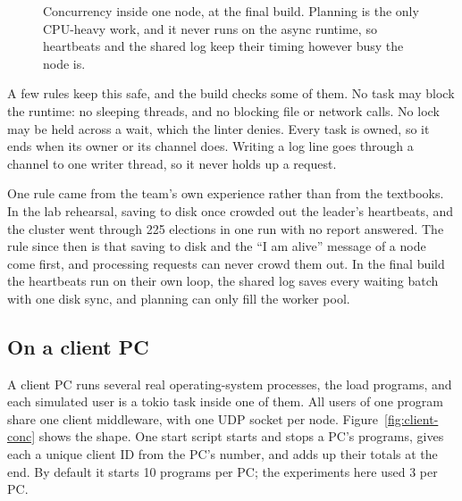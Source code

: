 \begin{figure}[!htb]
\caption{Concurrency inside one node, at the final build. Planning is the only CPU-heavy work, and it never runs on the async runtime, so heartbeats and the shared log keep their timing however busy the node is.}
\label{fig:node-conc}
\end{figure}

A few rules keep this safe, and the build checks some of them. No task may block the runtime: no sleeping threads, and no blocking file or network calls. No lock may be held across a wait, which the linter denies. Every task is owned, so it ends when its owner or its channel does. Writing a log line goes through a channel to one writer thread, so it never holds up a request.

One rule came from the team's own experience rather than from the textbooks. In the lab rehearsal, saving to disk once crowded out the leader's heartbeats, and the cluster went through 225 elections in one run with no report answered. The rule since then is that saving to disk and the ``I am alive'' message of a node come first, and processing requests can never crowd them out. In the final build the heartbeats run on their own loop, the shared log saves every waiting batch with one disk sync, and planning can only fill the worker pool.

\subsection{On a client PC}

A client PC runs several real operating-system processes, the load programs, and each simulated user is a tokio task inside one of them. All users of one program share one client middleware, with one UDP socket per node. Figure~\ref{fig:client-conc} shows the shape. One start script starts and stops a PC's programs, gives each a unique client ID from the PC's number, and adds up their totals at the end. By default it starts 10 programs per PC; the experiments here used 3 per PC.

